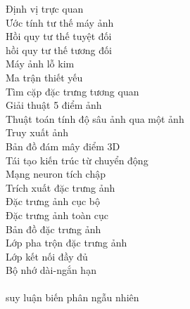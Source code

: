 \begin{keyword}
  		    {Định vị trực quan} 		    \\
  		{Ước tính tư thế máy ảnh} 		\\
  		{Hồi quy tư thế tuyệt đối} 		\\
  		{hồi quy tư thế tương đối} 		\\
  		        {Máy ảnh lỗ kim} 	        	\\
  		        {Ma trận thiết yếu} 		    \\
  		        {Tìm cặp đặc trưng tương quan} 	\\
  		        {Giải thuật 5 điểm ảnh} 		\\
  	{Thuật toán tính độ sâu ảnh qua một ảnh} 		\\
  		        {Truy xuất ảnh} 	        	\\
  		        {Bản đồ đám mây điểm 3D} 		\\
  		    {Tái tạo kiến trúc từ chuyển động} 	\\
  		{Mạng neuron tích chập} 		\\
  	        {Trích xuất đặc trưng ảnh} 		\\
  		        {Đặc trưng ảnh cục bộ} 	        \\
               {Đặc trưng ảnh toàn cục}        \\
                     {Bản đồ đặc trưng ảnh}          \\
                   {Lớp pha trộn đặc trưng ảnh}    \\
           {Lớp kết nối đầy đủ}            \\
          {Bộ nhớ dài-ngắn hạn}           \\
   \\
    {suy luận biến phân ngẫu nhiên} \\

\end{keyword}
